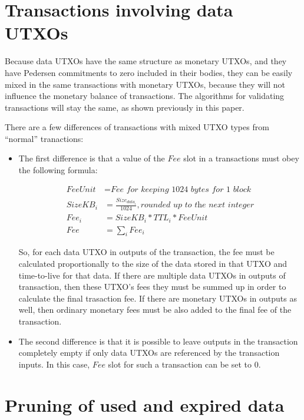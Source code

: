 \documentclass[8pt,fleqn,openany]{book}
\begin{document}
\section{Transactions involving data UTXOs}

Because data UTXOs have the same structure as monetary UTXOs, and they have Pedersen commitments to zero included in their bodies, they can be easily mixed in the same transactions with monetary UTXOs, because they will not influence the monetary balance of transactions. The algorithms for validating transactions will stay the same, as shown previously in this paper.

There are a few differences of transactions with mixed UTXO types from ``normal'' tranactions:

\begin{itemize}

  \item{The first difference is that a value of the $Fee$ slot in a transactions must obey the following formula:

  \begin{align*}
    FeeUnit &= \textit{Fee for keeping 1024 bytes for 1 block} \\
    SizeKB_i &= \frac{Size_{data_i}}{1024}, \textit{rounded up to the next integer}\\
    Fee_i &= SizeKB_i * TTL_i * FeeUnit\\
    Fee &= \sum_i Fee_i
  \end{align*}

  So, for each data UTXO in outputs of the transaction, the fee must be calculated proportionally to the size of the data stored in that UTXO and time-to-live for that data. If there are multiple data UTXOs in outputs of transaction, then these UTXO's fees they must be summed up in order to calculate the final trasaction fee. If there are monetary UTXOs in outputs as well, then ordinary monetary fees must be also added to the final fee of the transaction.}

  \item{The second difference is that it is possible to leave outputs in the transaction completely empty if only data UTXOs are referenced by the transaction inputs. In this case, $Fee$ slot for such a transaction can be set to $0$.}
\end{itemize}

\section{Pruning of used and expired data}\label{app:pruning}
\end{document}
